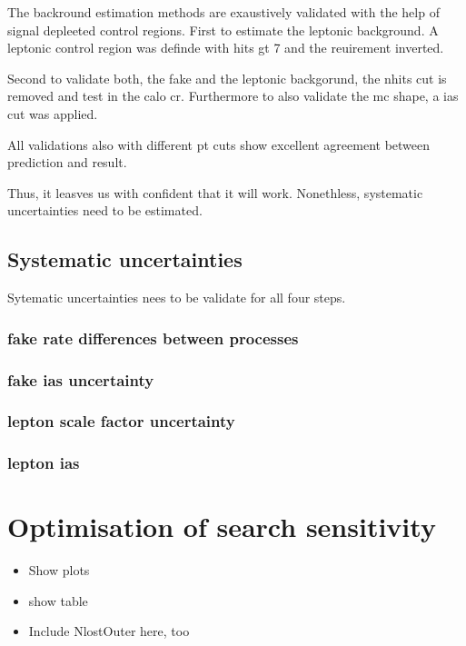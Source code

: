 The backround estimation methods are exaustively validated with the help of signal depleeted control regions.
First to estimate the leptonic background.
A leptonic control region was definde with hits gt 7 and the \ecalo reuirement inverted.

Second to validate both, the fake and the leptonic backgorund, the nhits cut is removed and test in the calo cr.
Furthermore to also validate the mc shape, a ias cut was applied.

All validations also with different pt cuts show excellent agreement between prediction and result.

Thus, it leasves us with confident that it will work.
Nonethless, systematic uncertainties need to be estimated.


\section{Systematic uncertainties}
\label{sec:SysUncertaintiesBkg}

Sytematic uncertainties nees to be validate for all four steps.
\subsection{fake rate differences between processes}
\subsection{fake ias uncertainty}
\subsection{lepton scale factor uncertainty}
\subsection{lepton ias}

\chapter{Optimisation of search sensitivity}
\label{sec:Optimisation}
\begin{itemize}
\item Show plots
\item show table
\item Include NlostOuter here, too
\end{itemize}


